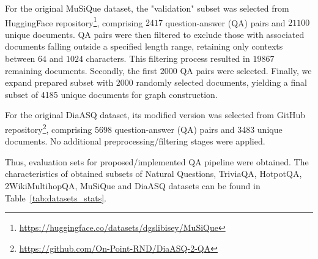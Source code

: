 For the original MuSiQue dataset, the "validation" subset was selected from HuggingFace repository\footnote{\url{https://huggingface.co/datasets/dgslibisey/MuSiQue}}, comprising $2417$ question-answer (QA) pairs and $21100$ unique documents. QA pairs were then filtered to exclude those with associated documents falling outside a specified length range, retaining only contexts between $64$ and $1024$ characters. This filtering process resulted in $19867$ remaining documents. Secondly, the first $2000$ QA pairs were selected. Finally, we expand prepared subset with $2000$ randomly selected documents, yielding a final subset of 4185 unique documents for graph construction.

For the original DiaASQ dataset, its modified version was selected from GitHub repository\footnote{\url{https://github.com/On-Point-RND/DiaASQ-2-QA}}, comprising 5698 question-answer (QA) pairs and 3483 unique documents. No additional preprocessing/filtering stages were applied.

Thus, evaluation sets for proposed/implemented QA pipeline were obtained. The characteristics of obtained subsets of Natural Questions, TriviaQA, HotpotQA, 2WikiMultihopQA, MuSiQue and DiaASQ datasets can be found in Table~\ref{tab:datasets_stats}.

